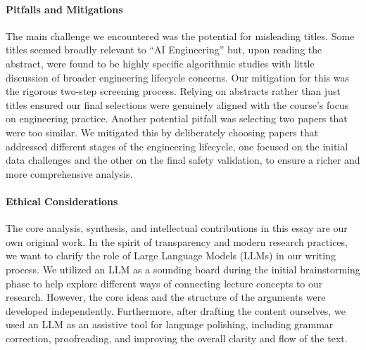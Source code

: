 \documentclass{article}
\begin{document}
\paragraph{Pitfalls and Mitigations}
The main challenge we encountered was the potential for misleading titles. Some titles seemed broadly relevant to ``AI Engineering'' but, upon reading the abstract, were found to be highly specific algorithmic studies with little discussion of broader engineering lifecycle concerns. Our mitigation for this was the rigorous two-step screening process. Relying on abstracts rather than just titles ensured our final selections were genuinely aligned with the course's focus on engineering practice. Another potential pitfall was selecting two papers that were too similar. We mitigated this by deliberately choosing papers that addressed different stages of the engineering lifecycle, one focused on the initial data challenges and the other on the final safety validation, to ensure a richer and more comprehensive analysis.

\paragraph{Ethical Considerations}
The core analysis, synthesis, and intellectual contributions in this essay are our own original work. In the spirit of transparency and modern research practices, we want to clarify the role of Large Language Models (LLMs) in our writing process.
We utilized an LLM as a sounding board during the initial brainstorming phase to help explore different ways of connecting lecture concepts to our research. However, the core ideas and the structure of the arguments were developed independently. Furthermore, after drafting the content ourselves, we used an LLM as an assistive tool for language polishing, including grammar correction, proofreading, and improving the overall clarity and flow of the text.



\end{document}
